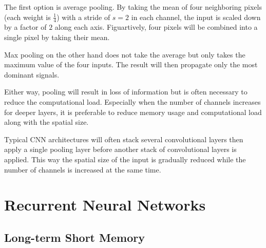 The first option is average pooling.
By taking the mean of four neighboring pixels (each weight is $\frac{1}{4}$) with a stride of $s = 2$ in each channel, the input is scaled down by a factor of $2$ along each axis.
Figuartively, four pixels will be combined into a single pixel by taking their mean.

Max pooling on the other hand does not take the average but only takes the maximum value of the four inputs.
The result will then propagate only the most dominant signals.

Either way, pooling will result in loss of information but is often necessary to reduce the computational load.
Especially when the number of channels increases for deeper layers, it is preferable to reduce memory usage and computational load along with the spatial size.

Typical CNN architectures will often stack several convolutional layers then apply a single pooling layer before another stack of convolutional layers is applied.
This way the spatial size of the input is gradually reduced while the number of channels is increased at the same time.
 

\section{Recurrent Neural Networks}
\subsection{Long-term Short Memory}


